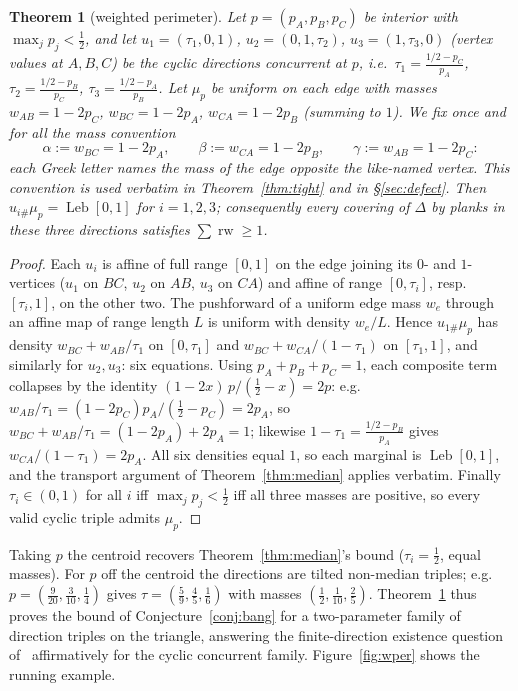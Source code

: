 \documentclass[11pt,reqno]{amsart}
\theoremstyle{plain}
\newtheorem{theorem}{Theorem}[section]
\theoremstyle{definition}
\theoremstyle{remark}
\newcommand{\rw}{\operatorname{rw}}
\newcommand{\Leb}{\operatorname{Leb}}
\begin{document}
\begin{theorem}[weighted perimeter]\label{thm:wper}
Let $p=(p_A,p_B,p_C)$ be interior with $\max_j p_j<\tfrac12$, and let
$u_1=(\tau_1,0,1)$, $u_2=(0,1,\tau_2)$, $u_3=(1,\tau_3,0)$ (vertex values at
$A,B,C$) be the cyclic directions concurrent at $p$, i.e.\
$\tau_1=\frac{1/2-p_C}{p_A}$, $\tau_2=\frac{1/2-p_B}{p_C}$,
$\tau_3=\frac{1/2-p_A}{p_B}$. Let $\mu_p$ be uniform on each edge with masses
$w_{AB}=1-2p_C$, $w_{BC}=1-2p_A$, $w_{CA}=1-2p_B$ (summing to $1$). We fix
once and for all the \emph{mass convention}
\[
\alpha:=w_{BC}=1-2p_A,\qquad \beta:=w_{CA}=1-2p_B,\qquad
\gamma:=w_{AB}=1-2p_C:
\]
each Greek letter names the mass of the edge \emph{opposite} the like-named
vertex. This convention is used verbatim in Theorem~\ref{thm:tight} and in
\S\ref{sec:defect}. Then
$u_{i\#}\mu_p=\Leb[0,1]$ for $i=1,2,3$; consequently every covering of $\Delta$ by
planks in these three directions satisfies $\sum\rw\ge1$.
\end{theorem}
\begin{proof}
Each $u_i$ is affine of full range $[0,1]$ on the edge joining its $0$- and
$1$-vertices ($u_1$ on $BC$, $u_2$ on $AB$, $u_3$ on $CA$) and affine of range
$[0,\tau_i]$, resp.\ $[\tau_i,1]$, on the other two. The pushforward of a uniform
edge mass $w_e$ through an affine map of range length $L$ is uniform with density
$w_e/L$. Hence $u_{1\#}\mu_p$ has density $w_{BC}+w_{AB}/\tau_1$ on $[0,\tau_1]$ and
$w_{BC}+w_{CA}/(1-\tau_1)$ on $[\tau_1,1]$, and similarly for $u_2,u_3$: six
equations. Using $p_A+p_B+p_C=1$, each composite term collapses by the identity
$(1-2x)\,p/(\tfrac12-x)=2p$: e.g.\
$w_{AB}/\tau_1=(1-2p_C)p_A/(\tfrac12-p_C)=2p_A$, so
$w_{BC}+w_{AB}/\tau_1=(1-2p_A)+2p_A=1$; likewise
$1-\tau_1=\frac{1/2-p_B}{p_A}$ gives $w_{CA}/(1-\tau_1)=2p_A$. All six densities
equal $1$, so each marginal is $\Leb[0,1]$, and the transport argument of
Theorem~\ref{thm:median} applies verbatim. Finally $\tau_i\in(0,1)$ for all $i$ iff
$\max_jp_j<\tfrac12$ iff all three masses are positive, so every valid cyclic triple
admits $\mu_p$.
\end{proof}
Taking $p$ the centroid recovers Theorem~\ref{thm:median}'s bound ($\tau_i=\tfrac12$,
equal masses). For $p$ off the centroid the directions are tilted non-median
triples; e.g.\ $p=(\tfrac9{20},\tfrac3{10},\tfrac14)$ gives
$\tau=(\tfrac59,\tfrac45,\tfrac16)$ with masses $(\tfrac12,\tfrac1{10},\tfrac25)$.
Theorem~\ref{thm:wper} thus proves the bound of Conjecture~\ref{conj:bang} for a
two-parameter family of direction triples on the triangle, answering the
finite-direction existence question of~\cite{Gardner88} affirmatively for the cyclic
concurrent family. Figure~\ref{fig:wper} shows the running example.
\end{document}
